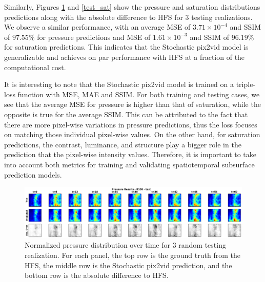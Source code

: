 \documentclass[10pt, twoside]{article}
\begin{document}
Similarly, Figures \ref{test_pres} and \ref{test_sat} show the pressure and saturation distributions predictions along with the absolute difference to HFS for 3 testing realizations. We observe a similar performance, with an average MSE of $3.71\times10^{-4}$ and SSIM of $97.55\%$ for pressure predictions and MSE of $1.61\times10^{-3}$ and SSIM of $96.19\%$ for saturation predictions. This indicates that the Stochastic pix2vid model is generalizable and achieves on par performance with HFS at a fraction of the computational cost.

It is interesting to note that the Stochastic pix2vid model is trained on a triple-loss function with MSE, MAE and SSIM. For both training and testing cases, we see that the average MSE for pressure is higher than that of saturation, while the opposite is true for the average SSIM. This can be attributed to the fact that there are more pixel-wise variations in pressure predictions, thus the loss focuses on matching those individual pixel-wise values. On the other hand, for saturation predictions, the contrast, luminance, and structure play a bigger role in the prediction that the pixel-wise intensity values. Therefore, it is important to take into account both metrics for training and validating spatiotemporal subsurface prediction models.

\begin{figure}
    \centering
    \includegraphics[width=\textwidth,height=0.95\textheight,keepaspectratio]{figures/test_pres.png}
    \caption{Normalized pressure distribution over time for 3 random testing realization. For each panel, the top row is the ground truth from the HFS, the middle row is the Stochastic pix2vid prediction, and the bottom row is the absolute difference to HFS.}
    \label{test_pres}
\end{figure}
\end{document}
